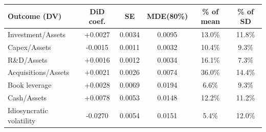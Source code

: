 \begin{tabular}{lccccc}
\toprule
Outcome (DV) & DiD coef. & SE & MDE(80\%) & \% of mean & \% of SD \\
\midrule
Investment/Assets & +0.0027 & 0.0034 & 0.0095 & 13.0\% & 11.8\% \\
Capex/Assets & -0.0015 & 0.0011 & 0.0032 & 10.4\% & 9.3\% \\
R\&D/Assets & +0.0016 & 0.0012 & 0.0034 & 16.1\% & 7.3\% \\
Acquisitions/Assets & +0.0021 & 0.0026 & 0.0074 & 36.0\% & 14.4\% \\
Book leverage & +0.0028 & 0.0069 & 0.0194 & 6.6\% & 9.3\% \\
Cash/Assets & +0.0078 & 0.0053 & 0.0148 & 12.2\% & 11.2\% \\
Idiosyncratic volatility & -0.0270 & 0.0054 & 0.0151 & 5.4\% & 12.0\% \\
\bottomrule
\end{tabular}